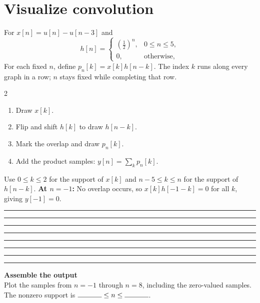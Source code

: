 \documentclass{ee102_notes}
\begin{document}
\thispagestyle{fancy}
\section*{Visualize convolution}
For $x[n]=u[n]-u[n-3]$ and
\[
h[n]=
\begin{cases}
\left(\tfrac12\right)^n, & 0\le n\le 5,\\
0, & \text{otherwise,}
\end{cases}
\]
For each fixed $n$, define $p_{n}[k]=x[k]h[n-k]$. The index $k$ runs along every graph in a row;
$n$ stays fixed while completing that row.
\begin{multicols}{2}
\begin{enumerate}[leftmargin=1.7em,itemsep=0pt,topsep=1pt]
  \item Draw $x[k]$.
  \item Flip and shift $h[k]$ to draw $h[n-k]$.
  \item Mark the overlap and draw $p_{n}[k]$.
  \item Add the product samples: $y[n]=\sum_k p_{n}[k]$.
\end{enumerate}
\end{multicols}
Use $0\le k\le2$ for the support of $x[k]$ and $n-5\le k\le n$ for the
support of $h[n-k]$.
\medskip
\noindent\textbf{At $n=-1$:} No overlap occurs, so
$x[k]h[-1-k]=0$ for all $k$, giving $y[-1]=0$.
\medskip
\hrule
\FilledPanelNZero
\hrule
{}
\hrule
{}
\hrule
\newpage
{}
\hrule
{}
\hrule
{}
\hrule
{}
\hrule
{}
\medskip
\begin{minipage}{\linewidth}
\noindent\textbf{Assemble the output}\\[-2pt]

Plot the samples from $n=-1$ through $n=8$, including the zero-valued
samples. The nonzero support is $\rule{1.2cm}{0.4pt}\le n\le\rule{1.2cm}{0.4pt}$.
\begin{center}
\OutputAxes
\end{center}
\end{minipage}
\end{document}
